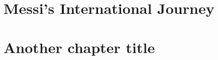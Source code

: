 \documentclass{report}
\begin{document}



\section*{\Large{}}


\setcounter{section}{0}%
\renewcommand{\thesection}{\arabic{chapter}.\Alph{section}}%

\setcounter{table}{0}%
\setcounter{figure}{0}%

\renewcommand{\thetable}{\arabic{chapter}.\Alph{table}}%
\captionsetup{labelformat=simple}

\renewcommand{\thefigure}{\arabic{chapter}.\Alph{figure}}%
\captionsetup{labelformat=simple}



\clearpage

\chapter{Messi's International Journey}


\renewcommand{\thesection}{\arabic{chapter}.\arabic{section}} %

\setcounter{table}{0}%
\setcounter{figure}{0}%

\renewcommand{\thetable}{\arabic{chapter}.\arabic{table}}%
\captionsetup{labelformat=simple}
\renewcommand{\thefigure}{\arabic{chapter}.\arabic{figure}}%
\captionsetup{labelformat=simple}



\clearpage

\chapter{Another chapter title}

\renewcommand{\thesection}{\arabic{chapter}.\arabic{section}} %

\setcounter{table}{0}%
\setcounter{figure}{0}%

\renewcommand{\thetable}{\arabic{chapter}.\arabic{table}}%
\captionsetup{labelformat=simple}
\renewcommand{\thefigure}{\arabic{chapter}.\arabic{figure}}%
\captionsetup{labelformat=simple}

% 


\printbibliography[title={BIBLIOGRAPHY}]
\end{document}
